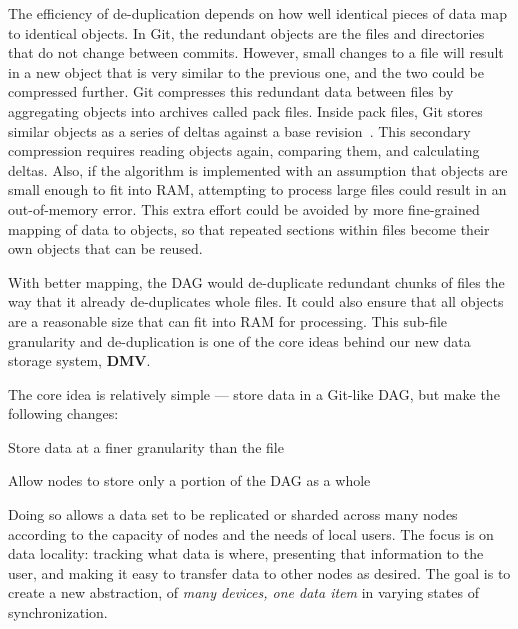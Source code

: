 The efficiency of de-duplication depends on how well identical pieces of data map to identical objects.
In Git, the redundant objects are the files and directories that do not change between commits.
However, small changes to a file will result in a new object that is very similar to the previous one, and the two could be compressed further.
Git compresses this redundant data between files by aggregating objects into archives called pack files.
Inside pack files, Git stores similar objects as a series of deltas against a base revision~\cite[Section 10.4]{git_book}.
This secondary compression requires reading objects again, comparing them, and calculating deltas.
Also, if the algorithm is implemented with an assumption that objects are small enough to fit into RAM, attempting to process large files could result in an out-of-memory error.
This extra effort could be avoided by more fine-grained mapping of data to objects, so that repeated sections within files become their own objects that can be reused.

With better mapping, the DAG would de-duplicate redundant chunks of files the way that it already de-duplicates whole files.
It could also ensure that all objects are a reasonable size that can fit into RAM for processing.
This sub-file granularity and de-duplication is one of the core ideas behind our new data storage system, \textbf{\acrfull{DMV}}.

%

The core idea is relatively simple --- store data in a Git-like \gls{DAG}, but make the following changes:

\begin{tight_enumerate}

    \item{Store data at a finer granularity than the file}

    \item{Allow nodes to store only a portion of the \gls{DAG} as a whole}

\end{tight_enumerate}

Doing so allows a data set to be replicated or sharded across many nodes according to the capacity of nodes and the needs of local users.
The focus is on data locality: tracking what data is where, presenting that information to the user, and making it easy to transfer data to other nodes as desired.
The goal is to create a new abstraction, of \emph{many devices, one data item} in varying states of synchronization.

